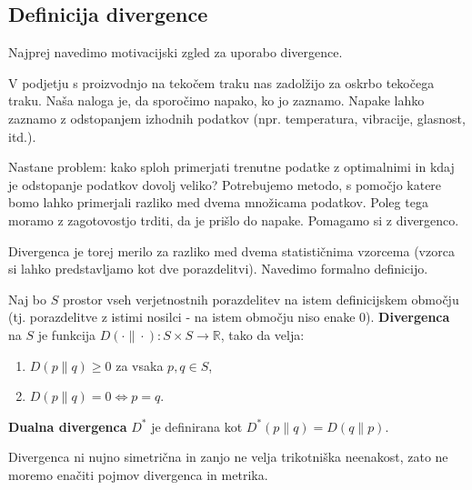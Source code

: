 \subsection{Definicija divergence}

Najprej navedimo motivacijski zgled za uporabo divergence.

\begin{zgled}
	V podjetju s proizvodnjo na tekočem traku nas zadolžijo za oskrbo tekočega traku. Naša naloga je, da sporočimo napako, ko jo zaznamo. Napake lahko zaznamo z odstopanjem izhodnih podatkov (npr. temperatura, vibracije, glasnost, itd.).

	Nastane problem: kako sploh primerjati trenutne podatke z optimalnimi in kdaj je odstopanje podatkov dovolj veliko? Potrebujemo metodo, s pomočjo katere bomo lahko primerjali razliko med dvema množicama podatkov. Poleg tega moramo z zagotovostjo trditi, da je prišlo do napake. Pomagamo si z divergenco.
\end{zgled}

Divergenca je torej merilo za razliko med dvema statističnima vzorcema (vzorca si lahko predstavljamo kot dve porazdelitvi). Navedimo formalno definicijo.

\begin{definicija}
	Naj bo $S$ prostor vseh verjetnostnih porazdelitev na istem definicijskem območju (tj. porazdelitve z istimi nosilci - na istem območju niso enake 0). \textbf{Divergenca} na $S$ je funkcija $D(\cdot \| \cdot): S \times S \rightarrow \mathbb{R}$, tako da velja:
	\begin{enumerate}
		\item $D(p \| q) \geq 0$ za vsaka $p, q \in S$,
		\item $D(p \| q) = 0 \Leftrightarrow p = q$.
	\end{enumerate}
	\textbf{Dualna divergenca} $D^\ast$ je definirana kot $D^\ast(p \| q) = D(q \| p)$.
\end{definicija}

Divergenca ni nujno simetrična in zanjo ne velja trikotniška neenakost, zato ne moremo enačiti pojmov divergenca in metrika.

